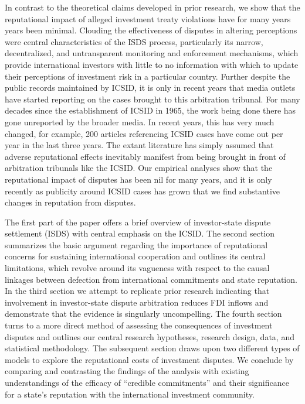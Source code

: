 \documentclass[12pt,onesided]{amsart}
\begin{document}
In contrast to the theoretical claims developed in prior research, we show that the reputational impact of alleged investment treaty violations have for many years years been minimal. Clouding the effectiveness of disputes in altering perceptions were central characteristics of the ISDS process, particularly its narrow, decentralized, and untransparent monitoring and enforcement mechanisms, which provide international investors with little to no information with which to update their perceptions of investment risk in a particular country. Further despite the public records maintained by ICSID, it is only in recent years that media outlets have started reporting on the cases brought to this arbitration tribunal. For many decades since the establishment of ICSID in 1965, the work being done there has gone unreported by the broader media. In recent years, this has very much changed, for example, 200 articles referencing ICSID cases have come out per year in the last three years. The extant literature has simply assumed that adverse reputational effects inevitably manifest from being brought in front of arbitration tribunals like the ICSID. Our empirical analyses show that the reputational impact of disputes has been nil for many years, and it is only recently as publicity around ICSID cases has grown that we find substantive changes in reputation from disputes.

The first part of the paper offers a brief overview of investor-state dispute settlement (ISDS) with central emphasis on the ICSID. The second section summarizes the basic argument regarding the importance of reputational concerns for sustaining international cooperation and outlines its central limitations, which revolve around its vagueness with respect to the causal linkages between defection from international commitments and state reputation. In the third section we attempt to replicate prior research indicating that involvement in investor-state dispute arbitration reduces FDI inflows and demonstrate that the evidence is singularly uncompelling. The fourth section turns to a more direct method of assessing the consequences of investment disputes and outlines our central research hypotheses, research design, data, and statistical methodology. The subsequent section draws upon two different types of models to explore the reputational costs of investment disputes. We conclude by comparing and contrasting the findings of the analysis with existing understandings of the efficacy of ``credible commitments'' and their significance for a state's reputation with the international investment community.
\end{document}
